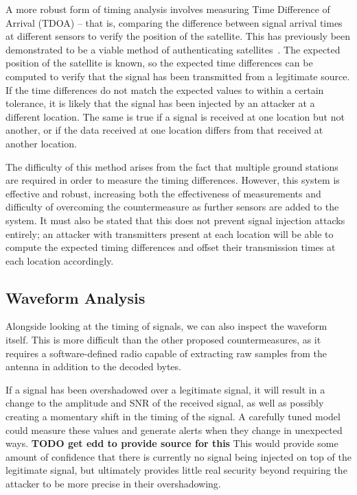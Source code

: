 A more robust form of timing analysis involves measuring Time Difference of Arrival (TDOA) -- that is, comparing the difference between signal arrival times at different sensors to verify the position of the satellite.
This has previously been demonstrated to be a viable method of authenticating satellites~\cite{jedermann2021orbit}.
The expected position of the satellite is known, so the expected time differences can be computed to verify that the signal has been transmitted from a legitimate source.
If the time differences do not match the expected values to within a certain tolerance, it is likely that the signal has been injected by an attacker at a different location.
The same is true if a signal is received at one location but not another, or if the data received at one location differs from that received at another location.

The difficulty of this method arises from the fact that multiple ground stations are required in order to measure the timing differences.
However, this system is effective and robust, increasing both the effectiveness of measurements and difficulty of overcoming the countermeasure as further sensors are added to the system.
It must also be stated that this does not prevent signal injection attacks entirely; an attacker with transmitters present at each location will be able to compute the expected timing differences and offset their transmission times at each location accordingly.


\subsection{Waveform Analysis}

Alongside looking at the timing of signals, we can also inspect the waveform itself.
This is more difficult than the other proposed countermeasures, as it requires a software-defined radio capable of extracting raw samples from the antenna in addition to the decoded bytes.

If a signal has been overshadowed over a legitimate signal, it will result in a change to the amplitude and SNR of the received signal, as well as possibly creating a momentary shift in the timing of the signal.
A carefully tuned model could measure these values and generate alerts when they change in unexpected ways.
\textbf{TODO get edd to provide source for this}
This would provide some amount of confidence that there is currently no signal being injected on top of the legitimate signal, but ultimately provides little real security beyond requiring the attacker to be more precise in their overshadowing.

